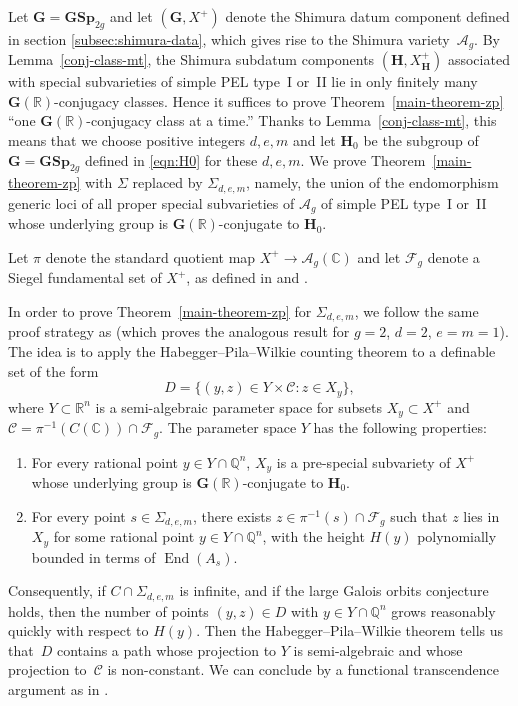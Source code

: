\documentclass[11pt]{article}
\numberwithin{equation}{section}
\newcommand{\bC}{\mathbb{C}}
\newcommand{\bQ}{\mathbb{Q}}
\newcommand{\bR}{\mathbb{R}}
\newcommand{\cC}{\mathcal{C}}
\newcommand{\Ag}{\mathcal{A}_g}
\newcommand{\Fg}{\mathcal{F}_g}
\newcommand{\gG}{\mathbf{G}}
\newcommand{\gGSp}{\mathbf{GSp}}
\newcommand{\gH}{\mathbf{H}}
\DeclareMathOperator{\End}{End}
\begin{document}
Let $\gG = \gGSp_{2g}$ and let $(\gG, X^+)$ denote the Shimura datum component defined in section \ref{subsec:shimura-data}, which gives rise to the Shimura variety~$\Ag$. By Lemma~\ref{conj-class-mt}, the Shimura subdatum components $(\gH, X_\gH^+)$ associated with special subvarieties of simple PEL type~I or~II lie in only finitely many $\gG(\bR)$-conjugacy classes. Hence it suffices to prove Theorem~\ref{main-theorem-zp} ``one $\gG(\bR)$-conjugacy class at a time.''
Thanks to Lemma~\ref{conj-class-mt}, this means that we choose positive integers $d,e,m$ and let $\gH_0$ be the subgroup of $\gG = \gGSp_{2g}$ defined in \eqref{eqn:H0} for these $d,e,m$.
We prove Theorem~\ref{main-theorem-zp} with $\Sigma$ replaced by $\Sigma_{d,e,m}$, namely, the union of the endomorphism generic loci of all proper special subvarieties of $\Ag$ of simple PEL type~I or~II whose underlying group is $\gG(\bR)$-conjugate to $\gH_0$.

Let $\pi$ denote the standard quotient map $X^+ \to \Ag(\bC)$ and let $\Fg$ denote a Siegel fundamental set of $X^+$, as defined in \cite[\S2]{Orr18} and \cite[\S2.G]{ExCM}.

In order to prove Theorem~\ref{main-theorem-zp} for $\Sigma_{d,e,m}$, we follow the same proof strategy as \cite{QRTUI} (which proves the analogous result for $g=2$, $d=2$, $e=m=1$).
The idea is to apply the Habegger--Pila--Wilkie counting theorem \cite[Cor.\,7.2]{HP16} to a definable set of the form
\[
D = \{ (y,z) \in Y \times \cC : z \in X_y \},
\]
where $Y \subset \bR^n$ is a semi-algebraic parameter space for subsets $X_y \subset X^+$ and $\cC = \pi^{-1}(C(\bC)) \cap \Fg$.
The parameter space $Y$ has the following properties:
\begin{enumerate}
\item\label{enum:1D1} For every rational point $y \in Y \cap \bQ^n$, $X_y$ is a pre-special subvariety of $X^+$ whose underlying group is $\gG(\bR)$-conjugate to $\gH_0$.
\item\label{enum:1D2} For every point $s \in \Sigma_{d,e,m}$, there exists $z \in \pi^{-1}(s) \cap \Fg$ such that $z$ lies in $X_y$ for some rational point $y \in Y \cap \bQ^n$, with the height $H(y)$ polynomially bounded in terms of $\End(A_s)$.
\end{enumerate}

Consequently, if $C \cap \Sigma_{d,e,m}$ is infinite, and if the large Galois orbits conjecture holds, then the number of points $(y,z) \in D$ with $y \in Y \cap \bQ^n$ grows reasonably quickly with respect to $H(y)$.
Then the Habegger--Pila--Wilkie theorem tells us that~$D$ contains a path whose projection to $Y$ is semi-algebraic and whose projection to~$\cC$ is non-constant.
We can conclude by a functional transcendence argument as in \cite[\S6.5]{QRTUI}.
\end{document}
